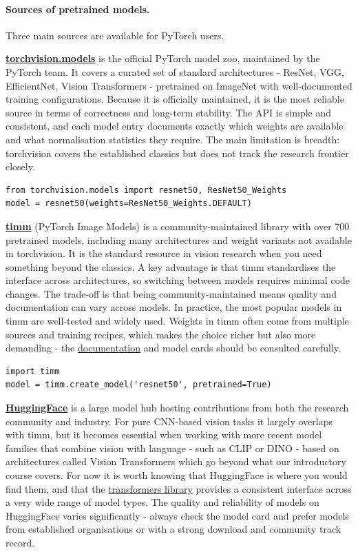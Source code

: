 \paragraph{Sources of pretrained models.} Three main sources are available for PyTorch users.

\textbf{\href{https://pytorch.org/vision/stable/models.html}{torchvision.models}} is the official PyTorch model zoo, maintained by the PyTorch team. It covers a curated set of standard architectures - ResNet, VGG, EfficientNet, Vision Transformers - pretrained on ImageNet with well-documented training configurations. Because it is officially maintained, it is the most reliable source in terms of correctness and long-term stability. The API is simple and consistent, and each model entry documents exactly which weights are available and what normalisation statistics they require. The main limitation is breadth: torchvision covers the established classics but does not track the research frontier closely.

\begin{verbatim}
from torchvision.models import resnet50, ResNet50_Weights
model = resnet50(weights=ResNet50_Weights.DEFAULT)
\end{verbatim}

\textbf{\href{https://github.com/huggingface/pytorch-image-models}{timm}} (PyTorch Image Models) is a community-maintained library with over 700 pretrained models, including many architectures and weight variants not available in torchvision. It is the standard resource in vision research when you need something beyond the classics. A key advantage is that timm standardises the interface across architectures, so switching between models requires minimal code changes. The trade-off is that being community-maintained means quality and documentation can vary across models. In practice, the most popular models in timm are well-tested and widely used. Weights in timm often come from multiple sources and training recipes, which makes the choice richer but also more demanding - the \href{https://huggingface.co/docs/timm/index}{documentation} and model cards should be consulted carefully.

\begin{verbatim}
import timm
model = timm.create_model('resnet50', pretrained=True)
\end{verbatim}

\textbf{\href{https://huggingface.co/models}{HuggingFace}} is a large model hub hosting contributions from both the research community and industry. For pure CNN-based vision tasks it largely overlaps with timm, but it becomes essential when working with more recent model families that combine vision with language - such as CLIP or DINO - based on architectures called Vision Transformers which go beyond what our introductory course covers. For now it is worth knowing that HuggingFace is where you would find them, and that the \href{https://huggingface.co/docs/transformers/index}{transformers library} provides a consistent interface across a very wide range of model types. The quality and reliability of models on HuggingFace varies significantly - always check the model card and prefer models from established organisations or with a strong download and community track record.

